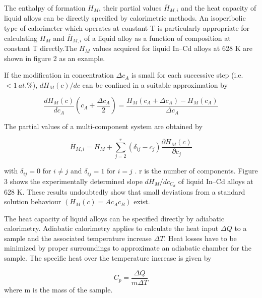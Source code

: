 \documentclass[12pt]{article}
\newcommand*{\1}{\hspace{1pt}}
\begin{document}
The enthalpy of formation $ H _M $, their partial values  $ \overline{H} _{M,i} $
and the heat capacity of liquid alloys can be directly specified by calorimetric methods.
An isoperibolic type of calorimeter which operates at constant T is particularly appropriate for
calculating $H _M $ and $ \overline{H} _{M,i} $ of a liquid alloy as a function of composition 
at constant T directly.The $ H _M $ values acquired for liquid In–Cd alloys at 628 K are
shown in figure 2 as an example.
\begin{adjustbox}{center,caption={Enthalpy of mixing of liquid Cd–In alloys.},label={somelabel},nofloat=figure,vspace=\bigskipamount}
\end{adjustbox}

If the modification in concentration $ \Delta c _A $ is small for each successive step (i.e. $ <  1 \ at.\% $),
$ dH _M (c)/dc $ can be confined in a suitable approximation by


    \begin{equation}
       \frac{ dH _M (c)}{dc _A} \left(c _A + \frac{\Delta c _A}{2} \right) = \frac{H _M 
       (c _A + \Delta c _A )-H _M (c _A)}{\Delta c _A } 
    \end{equation} 

The partial values of a multi-component system are obtained by

    \begin{equation}
        \overline{H} _{M,i} = H _M + \sum_{j = 2}^{r} (\delta _{ij} - c _j)\frac{\partial H _M{(c)}}{\partial c _j}   
    \end{equation} 

with $ \delta  _{ij} =0 $ for $i \neq  j$ and $ \delta  _{ij} =1 $ for $i = j$ . r is the 
number of components. Figure 3 shows the experimentally determined slope $ d H _M / dc _{C _d} $ 
of liquid In–Cd alloys at 628 K. These results undoubtedly show that small deviations from a standard solution behaviour $ (H _M (c) = Ac _Ac _B) $
exist.

The heat capacity of liquid alloys can be specified directly by adiabatic calorimetry.
Adiabatic calorimetry applies to calculate the heat input $ \Delta Q $ to a sample and the 
associated temperature increase $ \Delta T $.
Heat losses have to be minimized by proper surroundings to approximate an adiabatic
chamber for the sample. The specific heat over the temperature increase is given by 


    \begin{equation}
        C _p = \frac{\Delta Q}{m\Delta T} 
    \end{equation}   
where m is the mass of the sample.\\
\end{document}
